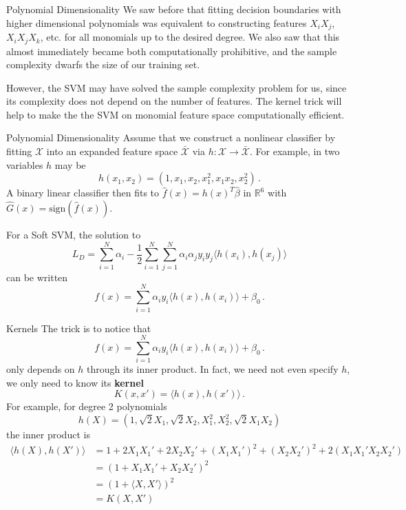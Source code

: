 \documentclass[10pt, table, dvipsnames,xcdraw]{beamer}
\newcommand{\cX}{\ensuremath{\mathcal{X}}}
\begin{document}
\begin{frame}[fragile]{Polynomial Dimensionality}
We saw before that fitting decision boundaries with higher dimensional polynomials was equivalent to constructing features $X_iX_j$, $X_iX_jX_k$, etc. for all monomials up to the desired degree. We also saw that this almost immediately became both computationally prohibitive, and the sample complexity dwarfs the size of our training set. \newline \pause

However, the SVM may have solved the sample complexity problem for us, since its complexity does not depend on the number of features. The kernel trick will help to make the the SVM on monomial feature space computationally efficient.
\end{frame}


\begin{frame}[fragile]{Polynomial Dimensionality}
Assume that we construct a nonlinear classifier by fitting $\mathcal{X}$ into an expanded feature space $\bar{\mathcal{X}}$ via $h:\cX\to \bar{\cX}$. For example, in two variables $h$ may be
$$
h(x_1,x_2) = (1,x_1,x_2,x_1^2,x_1x_2,x_2^2)\,.
$$\pause
A binary linear classifier then fits to $\hat{f}(x) = h(x)^T\hat\beta$ in $\mathbb{R}^6$ with $\hat{G}(x)= \text{sign}(\hat{f}(x))$.\pause\newline

For a Soft SVM, the solution to 
$$
L_D = \sum_{i=1}^N\alpha_i - \frac12 \sum_{i=1}^N\sum_{j=1}^N \alpha_i\alpha_jy_iy_j\langle h(x_i),h(x_j)\rangle
$$
can be written
$$
f(x) = \sum_{i=1}^N\alpha_iy_i \langle h(x),h(x_i)\rangle + \beta_0\,.
$$
\end{frame}



\begin{frame}[fragile]{Kernels}
The trick is to notice that
$$
f(x) = \sum_{i=1}^N\alpha_iy_i \langle h(x),h(x_i)\rangle + \beta_0\,.
$$
only depends on $h$ through its inner product. In fact, we need not even specify $h$, we only need to know its \textbf{kernel}
$$
K(x,x') = \langle h(x),h(x')\rangle\,.
$$\pause
For example, for degree 2 polynomials 
$$
h(X) = (1,\sqrt2 X_1,\sqrt2X_2, X_1^2,X_2^2,\sqrt2X_1X_2)
$$
the inner product is 
\begin{align*}
\langle h(X),h(X')\rangle &=  1 + 2X_1X_1' + 2X_2X_2' + (X_1X_1')^2 + (X_2X_2')^2 + 2(X_1X_1'X_2X_2')
\\
&= (1+X_1X_1' + X_2X_2')^2
\\
&= (1+\langle X,X'\rangle)^2
\\
&=K(X,X') 
\end{align*}
\end{frame}
\end{document}

